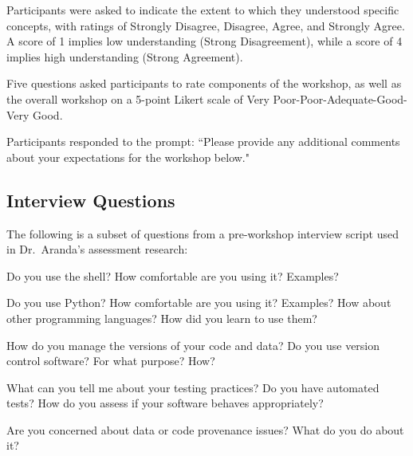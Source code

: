 \documentclass{proposalnsf}
\begin{document}
\begin{compactitem}
\item Participants were asked to indicate the extent to which they understood specific concepts, with ratings of Strongly Disagree, Disagree, Agree, and Strongly Agree. A score of 1 implies low understanding (Strong Disagreement), while a score of 4 implies high understanding (Strong Agreement).


\item Five questions asked participants to rate components of the
workshop, as well as the overall workshop on a 5-point Likert scale of Very Poor-Poor-Adequate-Good-Very Good. %

\item Participants responded to the prompt: ``Please provide any additional comments about your expectations for the workshop below."
\end{compactitem}

\subsection{Interview Questions}
\label{sec:survey}

The following is a subset of questions from a pre-workshop interview 
script used in Dr.\ Aranda's assessment research:

\begin{compactitem}
\item Do you use the shell? How comfortable are you using it? Examples?

\item Do you use Python? How comfortable are you using it? Examples? How about other programming languages? How did you learn to use them?

\item How do you manage the versions of your code and data? Do you use version control software? For what purpose? How?

\item What can you tell me about your testing practices? Do you have automated tests? How do you assess if your software behaves appropriately?

\item Are you concerned about data or code provenance issues? What do you do about it?
\end{compactitem}
\end{document}
